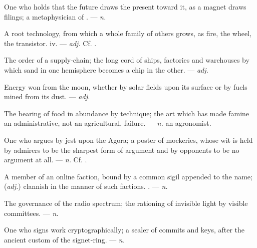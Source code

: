  One who holds that the future draws the present toward it, as a magnet draws filings; a metaphysician of . ---  \textit{n.}

 A root technology, from which a whole family of others grows, as fire, the wheel, the transistor.   iv. ---  \textit{adj.} Cf. .

 The order of a supply-chain; the long cord of ships, factories and warehouses by which sand in one hemisphere becomes a chip in the other. ---  \textit{adj.}

 Energy won from the moon, whether by solar fields upon its surface or by fuels mined from its dust. ---  \textit{adj.}

 The bearing of food in abundance by technique; the art which has made famine an administrative, not an agricultural, failure. ---  \textit{n.} an agronomist.

 One who argues by jest upon the Agora; a poster of mockeries, whose wit is held by admirers to be the sharpest form of argument and by opponents to be no argument at all.   ---  \textit{n.} Cf. .

 A member of an online faction, bound by a common sigil appended to the name; (\textit{adj.}) clannish in the manner of such factions. . ---  \textit{n.}

 The governance of the radio spectrum; the rationing of invisible light by visible committees. ---  \textit{n.}

 One who signs work cryptographically; a sealer of commits and keys, after the ancient custom of the signet-ring. ---  \textit{n.}

